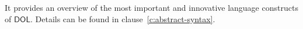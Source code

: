 \documentclass[10pt, a4paper]{isov2}
\makeatletter
\newcommand*\CommentAuthor{}
\renewcommand*\CommentAuthor{#1}}
\newcommand*\CommentDate{}
\renewcommand*\CommentDate{#1}}
\newcommand*\CommentId{}
\renewcommand*\CommentId{#1}}
\newcommand*\CommentType{}
\renewcommand*\CommentType{#1}}
\newcommand*{\SetCommentColorByType}[1]{%
\edef\localType{{#1}}%
\expandafter\ifstrequal\localType{q-aut}{\colorlet{CommentColor}{red}}{%
\expandafter\ifstrequal\localType{q-all}{\colorlet{CommentColor}{orange}}{%
\expandafter\ifstrequal\localType{todo}{\colorlet{CommentColor}{orange}}{%
\expandafter\ifstrequal\localType{fyi}{\colorlet{CommentColor}{lightgray}}{%
\colorlet{CommentColor}{yellow}}}}}}
\newcommand*{\SetCommentPrefixByType}[1]{%
\edef\localType{{#1}}%
\expandafter\@ifmtarg\localType{%
\edef\CommentPrefix{}%
}{%
\caseupper[q]{#1}%
\edef\CommentPrefix{\thestring: }%
}}
\newcommand*{\initComment}[1]{%
\setkeys{Comment}{#1}%
\SetCommentColorByType{\CommentType}%
\relax%
\SetCommentPrefixByType{\CommentType}%
\relax%
}
\newcommand*{\todonote}[2][]{%
\initComment{#1}%
\pdfcomment[author=\CommentAuthor,color=CommentColor,date=\CommentDate,id=\CommentId]{%
\CommentPrefix
#2}}
\renewcommand*{\todonote}[2][]{%
\initComment{#1}%
\ednote{\CommentPrefix #2}}
\newcommand*{\syntax}[1]{\texttt{#1}}
\newcommand*{\should}{\textbf{should}\xspace}
\newcommand*{\DOL}{\ensuremath{\mathsf{DOL}}\xspace}
\renewcommand{\clauserefname}{clause}
\renewcommand{\figurerefname}{Figure}
\renewcommand{\cref}[1]{\clauserefname~\ref{#1}}
\renewcommand{\fref}[1]{\figurerefname~\ref{#1}}
\makeatother
\begin{document}
%
%  
%
%
%
%
%
%
\label{c:design:overview}
%
%
 It provides an overview of  the most important and innovative language
constructs of \DOL. Details can be found in clause~\ref{c:abstract-syntax}.
\end{document}
